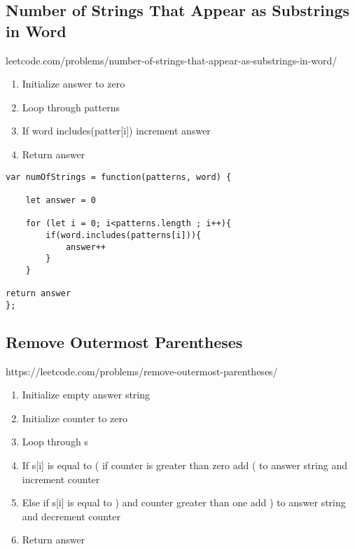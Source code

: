 \documentclass[10pt]{article}
\begin{document}
\medskip %





\pagebreak %
\medskip 
\subsection{Number of Strings That Appear as Substrings in Word}
leetcode.com/problems/number-of-strings-that-appear-as-substrings-in-word/

\begin{enumerate}
	\item Initialize answer to zero 
	\item Loop through patterns
	\item If word includes(patter[i]) increment answer
	\item Return answer
\end{enumerate}



\begin{lstlisting}[title=Solution numOfStrings, captionpos=t]
var numOfStrings = function(patterns, word) {

    let answer = 0
    
    for (let i = 0; i<patterns.length ; i++){
        if(word.includes(patterns[i])){
            answer++
        }
    }
    
return answer
};
\end{lstlisting}
\medskip %




\pagebreak %
\medskip 
\subsection{Remove Outermost Parentheses}
https://leetcode.com/problems/remove-outermost-parentheses/

\begin{enumerate}
	\item Initialize empty answer string
	\item Initialize counter to zero 
	\item Loop through s 
	\item If s[i] is equal to ( if counter is greater than zero add ( to answer string and increment counter
	\item Else if s[i] is equal to ) and counter greater than one add ) to answer string and decrement counter
	\item Return answer 
\end{enumerate}
\end{document}

